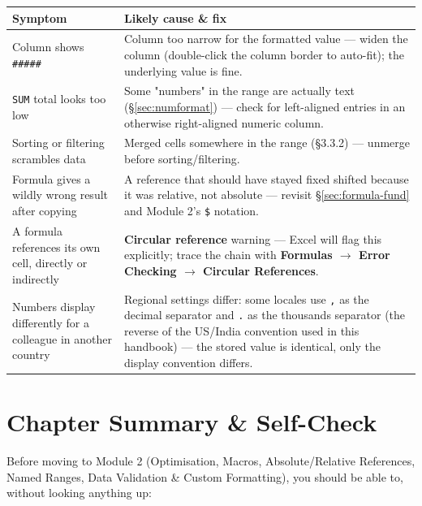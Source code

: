 \documentclass[11pt,a4paper]{article}
\begin{document}
\begin{center}
\begin{tabular}{@{}p{3.6cm}p{8.4cm}@{}}
\toprule
\textbf{Symptom} & \textbf{Likely cause \& fix} \\
\midrule
Column shows \texttt{\#\#\#\#\#} & Column too narrow for the formatted value --- widen the column (double-click the column border to auto-fit); the underlying value is fine. \\
\texttt{SUM} total looks too low & Some "numbers" in the range are actually text (\S\ref{sec:numformat}) --- check for left-aligned entries in an otherwise right-aligned numeric column. \\
Sorting or filtering scrambles data & Merged cells somewhere in the range (\S 3.3.2) --- unmerge before sorting/filtering. \\
Formula gives a wildly wrong result after copying & A reference that should have stayed fixed shifted because it was relative, not absolute --- revisit \S\ref{sec:formula-fund} and Module 2's \texttt{\$} notation. \\
A formula references its own cell, directly or indirectly & \textbf{Circular reference} warning --- Excel will flag this explicitly; trace the chain with \textbf{Formulas $\rightarrow$ Error Checking $\rightarrow$ Circular References}. \\
Numbers display differently for a colleague in another country & Regional settings differ: some locales use \texttt{,} as the decimal separator and \texttt{.} as the thousands separator (the reverse of the US/India convention used in this handbook) --- the stored value is identical, only the display convention differs. \\
\bottomrule
\end{tabular}
\end{center}

\section{Chapter Summary \& Self-Check}

Before moving to Module 2 (Optimisation, Macros, Absolute/Relative References, Named Ranges, Data Validation \& Custom Formatting), you should be able to, without looking anything up:
\end{document}
